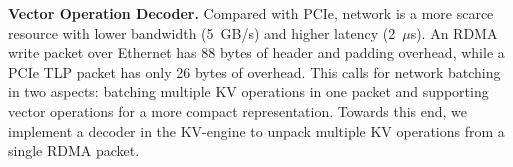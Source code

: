 
\textbf{Vector Operation Decoder.}
Compared with PCIe, network is a more scarce resource with lower bandwidth (5~GB/s) and higher latency (2~$\mu$s).
An RDMA write packet over Ethernet has 88 bytes of header and padding overhead, while a PCIe TLP packet has only 26 bytes of overhead.
This calls for network batching in two aspects: batching multiple KV operations in one packet and supporting vector operations for a more compact representation. Towards this end, we implement a decoder in the KV-engine to unpack multiple KV operations from a single RDMA packet.
